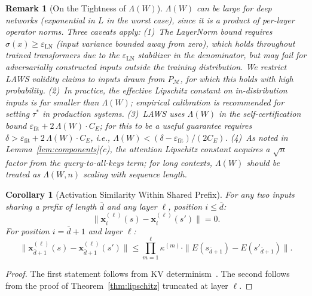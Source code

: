 \documentclass[11pt]{article}
\newtheorem{corollary}{Corollary}
\newtheorem{remark}{Remark}
\begin{document}
\begin{remark}[On the Tightness of $\Lambda(W)$]
\label{rem:lambda}
$\Lambda(W)$ can be large for deep networks (exponential in $L$ in the worst
case), since it is a product of per-layer operator norms.  Three caveats apply:
(1)~The LayerNorm bound requires $\sigma(x) \geq \varepsilon_{\mathrm{LN}}$
(input variance bounded away from zero), which holds throughout trained
transformers due to the $\varepsilon_{\mathrm{LN}}$ stabilizer in the denominator,
but may fail for adversarially constructed inputs outside the training
distribution.  We restrict LAWS validity claims to inputs drawn from
$P_{\mathcal{M}}$, for which this holds with high probability.
(2)~In practice, the \emph{effective} Lipschitz constant on in-distribution
inputs is far smaller than $\Lambda(W)$; empirical calibration is recommended
for setting $\tau^*$ in production systems.
(3)~LAWS uses $\Lambda(W)$ in the self-certification bound $\varepsilon_{\mathrm{fit}} + 2\,\Lambda(W) \cdot C_E$; for this to be a useful guarantee requires
$\delta > \varepsilon_{\mathrm{fit}} + 2\,\Lambda(W) \cdot C_E$, i.e., $\Lambda(W) < (\delta - \varepsilon_{\mathrm{fit}})/(2 C_E)$.
(4)~As noted in Lemma~\ref{lem:components}(c), the attention Lipschitz constant acquires
a $\sqrt{n}$ factor from the query-to-all-keys term; for long contexts, $\Lambda(W)$
should be treated as $\Lambda(W,n)$ scaling with sequence length.
\end{remark}

\begin{corollary}[Activation Similarity Within Shared Prefix]
\label{cor:shared_prefix}
For any two inputs sharing a prefix of length $\bar{d}$ and any layer $\ell$,
position $i \leq \bar{d}$:
\[
  \|\mathbf{x}^{(\ell)}_i(s) - \mathbf{x}^{(\ell)}_i(s')\| = 0.
\]
For position $i = \bar{d}+1$ and layer $\ell$:
\[
  \|\mathbf{x}^{(\ell)}_{\bar{d}+1}(s) - \mathbf{x}^{(\ell)}_{\bar{d}+1}(s')\|
  \leq \prod_{m=1}^{\ell} \kappa^{(m)} \cdot \|E(s_{\bar{d}+1}) - E(s'_{\bar{d}+1})\|.
\]
\end{corollary}

\begin{proof}
The first statement follows from KV determinism~\cite{kv2026}.  The second
follows from the proof of Theorem~\ref{thm:lipschitz} truncated at layer $\ell$.
\end{proof}
\end{document}
